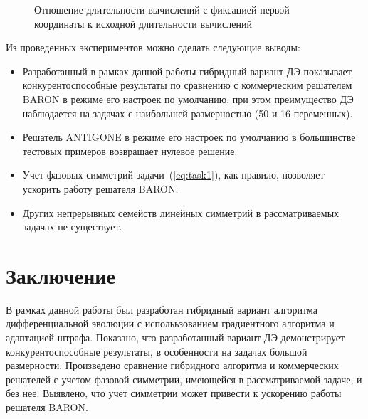 \begin{figure}
\caption{Отношение длительности вычислений с фиксацией первой координаты к исходной длительности вычислений}
\label{ris:ring}
\end{figure}

Из проведенных экспериментов можно сделать следующие выводы:
\begin{itemize}
  \item Разработанный в рамках данной работы гибридный вариант ДЭ показывает конкурентоспособные результаты по сравнению с коммерческим решателем BARON в режиме его настроек по умолчанию, при этом преимущество ДЭ наблюдается на задачах с наибольшей размерностью (50 и 16 переменных).
  \item Решатель ANTIGONE в режиме его настроек по умолчанию в большинстве тестовых примеров возвращает нулевое решение.
  \item Учет фазовых симметрий задачи~(\ref{eq:task1}), как правило, позволяет ускорить работу решателя BARON.
  \item Других непрерывных семейств линейных симметрий в рассматриваемых задачах не существует.
\end{itemize}

\section{Заключение}\label{sec:conclusion}

В рамках данной работы был разработан гибридный вариант алгоритма дифференциальной эволюции с исполььзованием
градиентного алгоритма и адаптацией штрафа. Показано, что разработанный вариант ДЭ демонстрирует конкурентоспособные результаты, в
особенности на задачах большой размерности. Произведено сравнение гибридного алгоритма и коммерческих решателей с
учетом фазовой симметрии, имеющейся в рассматриваемой задаче, и без нее. Выявлено, что учет симметрии может привести
к ускорению работы решателя BARON.
